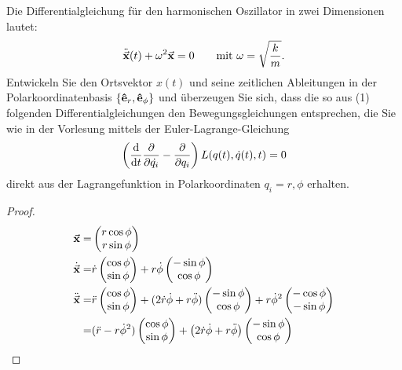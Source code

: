 \begin{Problem}
	Die Differentialgleichung für den harmonischen Oszillator in zwei Dimensionen lautet:
	\[
		\ddot{\va x}(t)+\omega^2\va x=0\qquad\text{mit }\omega=\sqrt{\frac{k}{m}} 
	.\] 
Entwickeln Sie den Ortsvektor $x(t)$ und seine zeitlichen Ableitungen in der Polarkoordinatenbasis $\{\vu e_r , \vu e_\phi \}$ und überzeugen Sie sich, dass die so aus (1) folgenden Differentialgleichungen den Bewegungsgleichungen entsprechen, die Sie wie in der Vorlesung mittels der Euler-Lagrange-Gleichung
\[
	\left( \dv{t}\pdv{\dot{q_i}}-\pdv{q_i} \right) L(q(t),\dot{q}(t),t)=0
\] 
direkt aus der Lagrangefunktion in Polarkoordinaten $q_i=r,\phi$ erhalten.
\end{Problem}
\begin{proof}
	\begin{align*}
		\va x=&\begin{pmatrix} r\cos\phi \\ r\sin\phi \end{pmatrix} \\
		\dot{\va x}=&\dot{r}\begin{pmatrix} \cos\phi\\ \sin\phi \end{pmatrix} +r\dot\phi \begin{pmatrix} -\sin\phi \\ \cos\phi \end{pmatrix} \\ 
		\ddot{\va x}=&\ddot{r}\begin{pmatrix} \cos\phi \\ \sin\phi \end{pmatrix} +(2\dot{r}\dot{\phi}+r\ddot{\phi})\begin{pmatrix} -\sin\phi \\ \cos\phi \end{pmatrix}+r\dot{\phi}^2 \begin{pmatrix} -\cos\phi \\ -\sin\phi \end{pmatrix} \\
		=&(\ddot{r}-r\dot{\phi}^2)\begin{pmatrix} \cos\phi \\ \sin \phi \end{pmatrix} +\left( 2\dot{r}\dot{\phi}+r\ddot{\phi} \right) \begin{pmatrix} -\sin\phi \\ \cos\phi \end{pmatrix} 
	\end{align*}

\end{proof}
